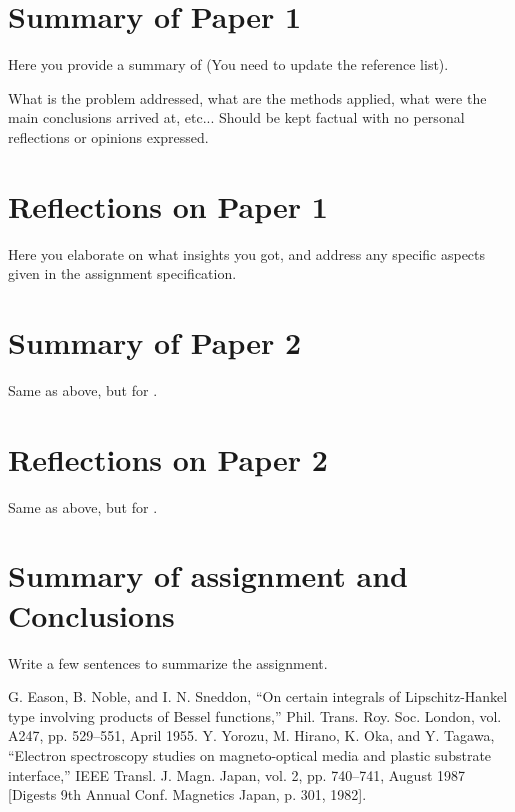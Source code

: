 \documentclass[conference]{IEEEtran}
\begin{document}
\section{Summary of Paper 1}
Here you provide a summary of \cite{b1} (You need to update the reference list).

What is the problem addressed, what are the methods applied, what were the main conclusions arrived at, etc...
Should be kept factual with no personal reflections or opinions expressed.

\section{Reflections on Paper 1}
Here you elaborate on what insights you got, and address  any specific aspects given in the assignment specification.



\section{Summary of Paper 2}
Same as above, but for \cite{b2}.

\section{Reflections on Paper 2}
Same as above, but for \cite{b2}.

\section{Summary of assignment and Conclusions}
Write a few sentences to summarize the assignment.





\begin{thebibliography}{00}
 G. Eason, B. Noble, and I. N. Sneddon, ``On certain integrals of Lipschitz-Hankel type involving products of Bessel functions,'' Phil. Trans. Roy. Soc. London, vol. A247, pp. 529--551, April 1955.
 Y. Yorozu, M. Hirano, K. Oka, and Y. Tagawa, ``Electron spectroscopy studies on magneto-optical media and plastic substrate interface,'' IEEE Transl. J. Magn. Japan, vol. 2, pp. 740--741, August 1987 [Digests 9th Annual Conf. Magnetics Japan, p. 301, 1982].
\end{thebibliography}
\end{document}
